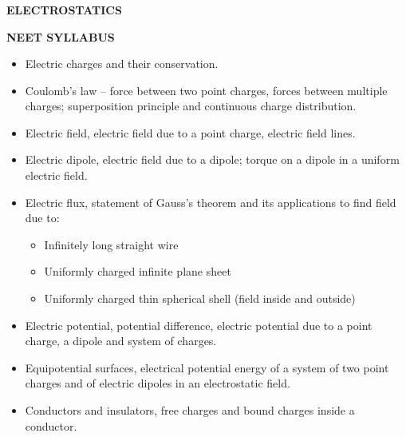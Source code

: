 \transfade[duration=0.5]

\begin{frame}[t]
\frametitle{}


\noindent
\begin{center}
    \Huge\bfseries ELECTROSTATICS
\end{center}

\vspace{1em}

\noindent
\colorbox{gray!80}{%
    \parbox[c][1.2cm][c]{0.95\textwidth}{%
        \centering\color{white}\large\bfseries NEET SYLLABUS
    }%
}

\vspace{1em}
\end{frame}
 
\begin{frame}[t]
\begin{itemize}
\item<+-> Electric charges and their conservation.
    \item<+-> Coulomb's law – force between two point charges, forces between multiple charges; superposition principle and continuous charge distribution.
    \item<+-> Electric field, electric field due to a point charge, electric field lines.
    \item<+-> Electric dipole, electric field due to a dipole; torque on a dipole in a uniform electric field.
    \item<+-> Electric flux, statement of Gauss's theorem and its applications to find field due to:
    \begin{itemize}
        \item<+-> Infinitely long straight wire
        \item<+-> Uniformly charged infinite plane sheet
        \item<+-> Uniformly charged thin spherical shell (field inside and outside)
    \end{itemize}
    \item<+-> Electric potential, potential difference, electric potential due to a point charge, a dipole and system of charges.
    \item<+-> Equipotential surfaces, electrical potential energy of a system of two point charges and of electric dipoles in an electrostatic field.
    \item<+-> Conductors and insulators, free charges and bound charges inside a conductor.
\end{itemize}
\end{frame}

